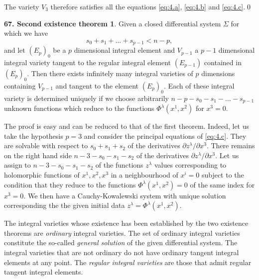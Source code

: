 \documentclass[leqno,11pt]{book}
\numberwithin{equation}{chapter}
\newcommand{\pd}{\partial}
\theoremstyle{shape1}
\theoremstyle{shape0}
\theoremstyle{shape2}
\theoremstyle{definition}
\begin{document}
The variety $V_{3}$ therefore satisfies all the equations \eqref{eq:4.a}, \eqref{eq:4.b} and \eqref{eq:4.c}.\qed


\vspace{12pt}\addtocounter{frenchsec}{1}
\theoremstyle{shape1}
\newtheorem*{thm67}{\hspace{15pt}\textbf{67.} Second existence theorem}
\begin{thm67}
  Given a closed differential system $\Sigma$ for which we have
\[
s_{0}+s_{1}+\dots+s_{p-1}<n-p,
\]
and let $(E_{p})_{0}$ be a $p$ dimensional integral element and $V_{p-1}$ a $p-1$ dimensional integral variety tangent to the regular integral element $(E_{p-1})$ contained in $(E_{p})_{0}$. Then there exists infinitely many integral varieties of $p$ dimensions containing $V_{p-1}$ and tangent to the element $(E_{p})_{0}$. Each of these integral variety is determined uniquely if we choose arbitrarily $n-p-s_{0}-s_{1}-\dots-s_{p-1}$ unknown functions which reduce to the functions $\Phi^{\lambda}(x^{1},x^{2})$ for $x^{3}=0$.
\end{thm67}

The proof is easy and can be reduced to that of the first theorem. Indeed, let us take the hypothesis $p=3$ and consider the principal equations of \eqref{eq:4.c}. They are solvable with respect to $s_{0}+s_{1}+s_{2}$ of the derivatives $\pd z^{\lambda}/\pd x^{3}$. There remains on the right hand side $n-3-s_{0}-s_{1}-s_{2}$ of the derivatives $\pd z^{\lambda}/\pd x^{3}$. Let us assign to $n-3-s_{0}-s_{1}-s_{2}$ of the functions $z^{\lambda}$  values corresponding to holomorphic functions of $x^{1},x^{2},x^{3}$ in a neighbourhood of $x^{i}=0$ subject to the condition that they reduce to the functions $\Phi^{\lambda}(x^{1},x^{2})=0$ of the same index for $x^{3}=0$. We then have a Cauchy-Kowalewski system with unique solution corresponding the the given initial data $z^{\lambda}=\Phi^{\lambda}(x^{1},x^{2})$.

\vspace{12pt}\fsec The integral varieties whose existence has been established by the two existence theorems are \emph{ordinary} integral varieties. The set of ordinary integral varieties constitute  the so-called \emph{general solution} of the given differential system. The integral varieties that are not ordinary do not have ordinary tangent integral elements at any point. The \emph{regular integral varieties} are those that admit regular tangent integral elements.
\end{document}
